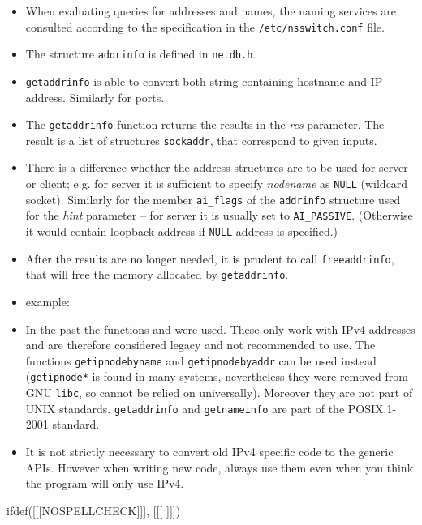 \begin{itemize}
\item When evaluating queries for addresses and names, the naming services
are consulted according to the specification in the \texttt{/etc/nsswitch.conf}
file.
\item The structure \texttt{addrinfo} is defined in \texttt{netdb.h}.
\item \texttt{getaddrinfo} is able to convert both string containing hostname
and IP address. Similarly for ports.
\item The \texttt{getaddrinfo} function returns the results in the \emph{res}
parameter. The result is a list of structures \texttt{sockaddr}, that correspond
to given inputs.
\item There is a difference whether the address structures are to be used for
server or client; e.g. for server it is sufficient to specify \emph{nodename} as
\texttt{NULL} (wildcard socket). Similarly for the member \texttt{ai\_flags} of
the \texttt{addrinfo} structure used for the \emph{hint} parameter -- for server
it is usually set to \texttt{AI\_PASSIVE}. (Otherwise it would contain loopback
address if \texttt{NULL} address is specified.)
\item After the results are no longer needed, it is prudent to call
\texttt{freeaddrinfo}, that will free the memory allocated by
\texttt{getaddrinfo}.
\item \label{GETADDRINFO} example: 
\item In the past the functions  and
 were used. These only work with IPv4 addresses and are
therefore considered legacy and not recommended to use. The functions
\texttt{getipnodebyname} and \texttt{getipnodebyaddr} can be used instead
(\texttt{getipnode*} is found in many systems, nevertheless they were removed
from GNU \texttt{libc}, so cannot be relied on universally). Moreover they are
not part of UNIX standards.
\texttt{get\-addr\-info} and \texttt{getnameinfo} are part of the POSIX.1-2001
standard.
\item It is not strictly necessary to convert old IPv4 specific code to the
generic APIs. However when writing new code, always use them even when you
think the program will only use IPv4.
\end{itemize}



ifdef([[[NOSPELLCHECK]]], [[[
]]])

